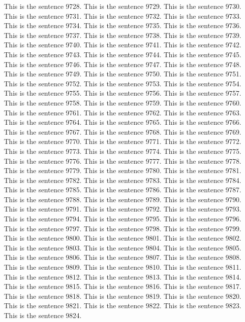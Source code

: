 \documentclass{article}
\begin{document}
This is the sentence 9728.
This is the sentence 9729.
This is the sentence 9730.
This is the sentence 9731.
This is the sentence 9732.
This is the sentence 9733.
This is the sentence 9734.
This is the sentence 9735.
This is the sentence 9736.
This is the sentence 9737.
This is the sentence 9738.
This is the sentence 9739.
This is the sentence 9740.
This is the sentence 9741.
This is the sentence 9742.
This is the sentence 9743.
This is the sentence 9744.
This is the sentence 9745.
This is the sentence 9746.
This is the sentence 9747.
This is the sentence 9748.
This is the sentence 9749.
This is the sentence 9750.
This is the sentence 9751.
This is the sentence 9752.
This is the sentence 9753.
This is the sentence 9754.
This is the sentence 9755.
This is the sentence 9756.
This is the sentence 9757.
This is the sentence 9758.
This is the sentence 9759.
This is the sentence 9760.
This is the sentence 9761.
This is the sentence 9762.
This is the sentence 9763.
This is the sentence 9764.
This is the sentence 9765.
This is the sentence 9766.
This is the sentence 9767.
This is the sentence 9768.
This is the sentence 9769.
This is the sentence 9770.
This is the sentence 9771.
This is the sentence 9772.
This is the sentence 9773.
This is the sentence 9774.
This is the sentence 9775.
This is the sentence 9776.
This is the sentence 9777.
This is the sentence 9778.
This is the sentence 9779.
This is the sentence 9780.
This is the sentence 9781.
This is the sentence 9782.
This is the sentence 9783.
This is the sentence 9784.
This is the sentence 9785.
This is the sentence 9786.
This is the sentence 9787.
This is the sentence 9788.
This is the sentence 9789.
This is the sentence 9790.
This is the sentence 9791.
This is the sentence 9792.
This is the sentence 9793.
This is the sentence 9794.
This is the sentence 9795.
This is the sentence 9796.
This is the sentence 9797.
This is the sentence 9798.
This is the sentence 9799.
This is the sentence 9800.
This is the sentence 9801.
This is the sentence 9802.
This is the sentence 9803.
This is the sentence 9804.
This is the sentence 9805.
This is the sentence 9806.
This is the sentence 9807.
This is the sentence 9808.
This is the sentence 9809.
This is the sentence 9810.
This is the sentence 9811.
This is the sentence 9812.
This is the sentence 9813.
This is the sentence 9814.
This is the sentence 9815.
This is the sentence 9816.
This is the sentence 9817.
This is the sentence 9818.
This is the sentence 9819.
This is the sentence 9820.
This is the sentence 9821.
This is the sentence 9822.
This is the sentence 9823.
This is the sentence 9824.
\end{document}
